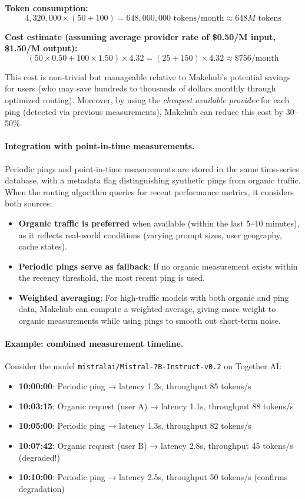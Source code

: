 \documentclass[english]{article}
\begin{document}
\textbf{Token consumption:}
\[
4{,}320{,}000 \times (50 + 100) = 648{,}000{,}000 \text{ tokens/month} \approx 648M \text{ tokens}
\]

\textbf{Cost estimate (assuming average provider rate of \$0.50/M input, \$1.50/M output):}
\[
(50 \times 0.50 + 100 \times 1.50) \times 4.32 = (25 + 150) \times 4.32 \approx \$756/\text{month}
\]

This cost is non-trivial but manageable relative to Makehub's potential savings for users (who may save hundreds to thousands of dollars monthly through optimized routing). Moreover, by using the \emph{cheapest available provider} for each ping (detected via previous measurements), Makehub can reduce this cost by 30--50\%.

\paragraph{Integration with point-in-time measurements.}

Periodic pings and point-in-time measurements are stored in the same time-series database, with a metadata flag distinguishing synthetic pings from organic traffic. When the routing algorithm queries for recent performance metrics, it considers both sources:
\begin{itemize}
    \item \textbf{Organic traffic is preferred} when available (within the last 5--10 minutes), as it reflects real-world conditions (varying prompt sizes, user geography, cache states).
    \item \textbf{Periodic pings serve as fallback}: If no organic measurement exists within the recency threshold, the most recent ping is used.
    \item \textbf{Weighted averaging}: For high-traffic models with both organic and ping data, Makehub can compute a weighted average, giving more weight to organic measurements while using pings to smooth out short-term noise.
\end{itemize}

\paragraph{Example: combined measurement timeline.}

Consider the model \texttt{mistralai/Mistral-7B-Instruct-v0.2} on Together AI:
\begin{itemize}
    \item \textbf{10:00:00}: Periodic ping → latency 1.2s, throughput 85 tokens/s
    \item \textbf{10:03:15}: Organic request (user A) → latency 1.1s, throughput 88 tokens/s
    \item \textbf{10:05:00}: Periodic ping → latency 1.3s, throughput 82 tokens/s
    \item \textbf{10:07:42}: Organic request (user B) → latency 2.8s, throughput 45 tokens/s (degraded!)
    \item \textbf{10:10:00}: Periodic ping → latency 2.5s, throughput 50 tokens/s (confirms degradation)
\end{itemize}
\end{document}
